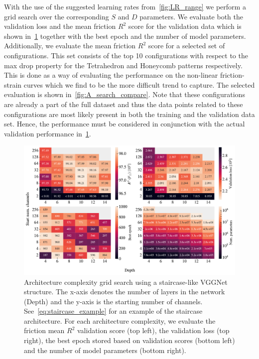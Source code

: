 With the use of the suggested learning rates from~\cref{fig:LR_range} we perform
a grid search over the corresponding $S$ and $D$ parameters. We evaluate both
the validation loss and the mean friction $R^2$ score for the validation data which is shown in~\cref{fig:A_search_perf} together with the best epoch and the number of model parameters. Additionally, we evaluate the mean friction $R^2$ score for a selected set of configurations. This set consists of the top 10 configurations with respect to the max drop property for the Tetrahedron and Honeycomb patterns respectively. This is done as a way of evaluating the performance on the non-linear friction-strain curves which we find to be the more difficult trend to capture. The selected evaluation is shown in~\cref{fig:A_search_compare}. Note that these configurations are already a part of the full dataset and thus the data points related to these configurations are most likely present in both the training and the validation data set. Hence, the performance must be considered in conjunction with the actual validation performance in~\cref{fig:A_search_perf}.

\begin{figure}[!htb]
  \centering
  \includegraphics[width=0.88\linewidth]{figures/ML/A_search_perf.pdf}
  \caption{Architecture complexity grid search using a staircase-like VGGNet structure. The x-axis denotes the number of layers in the network (Depth) and the y-axis is the starting number of channels. See~\cref{eq:staircase_example} for an example of the staircase architecture. For each architecture complexity, we evaluate the friction mean $R^2$ validation score (top left), the validation loss (top right), the best epoch stored based on validation scores (bottom left) and the number of model parameters (bottom right).}
  \label{fig:A_search_perf}
\end{figure}  

